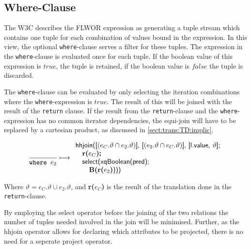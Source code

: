 \subsection{Where-Clause}
The W3C describes the FLWOR expression as generating a tuple stream which contains one tuple for each combination
of values bound in the expression\cite{w3c00}. In this view, the optional \texttt{where}-clause serves a filter
for these tuples. The expression in the \texttt{where}-clause is evaluated once for each tuple. If the boolean
value of this expression is $true$, the tuple is retained, if the boolean value is $false$ the tuple is discarded.

The \texttt{where}-clause can be evaluated by only selecting the iteration combinations where the
\texttt{where}-expression is $true$. The result of this will be joined with the result of the \texttt{return}
clause. If the result from the \texttt{return}-clause and the \texttt{where}-expression has no common iterator
dependencies, the equi-join will have to be replaced by a cartesian product, as discussed in
\ref{sect:trans:TD:implic}.

\begin{equation}
\frac{}{\mbox{\texttt{where }}e_2}\longmapsto
\begin{array}{l}
\mbox{\textsf{hhjoin([}}(e_{C}.\vartheta \cap e_2.\vartheta)\mbox{\textsf{], [}}(e_{2}.\vartheta \cap
e_{C}.\vartheta)\mbox{\textsf{], [l.value, }} \vartheta\mbox{\textsf{];}} \\ \quad
\mbox{\textbf{r(}}e_{C}\mbox{\textbf{)\textsf{;}}} \\ \quad
\mbox{\textsf{select(xqBoolean(pred);}} \\ \quad \quad
\mbox{\textbf{B(r(}}e_{2}\mbox{\textbf{)}\textsf{)))}}
\end{array}
\label{rule:trans:TD:where}
\end{equation}

Where $\vartheta = e_{C}.\vartheta \cup e_{2}.\vartheta$, and \textbf{r(}$e_{C}$\textbf{)} is the result of the
translation done in the \texttt{return}-clause.

By employing the \textsf{select} operator before the joining of the two relations the number of tuples needed
involved in the join will be minimised. Further, as the \textsf{hhjoin} operator allows for declaring which
attributes to be projected, there is no need for a seperate \textsf{project} operator.

